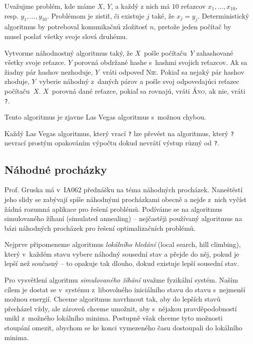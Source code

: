 \begin{example}
    Uvažujme problém, kde máme $X$, $Y$, a každý z nich má $10$ reťazcov
	$x_1, \ldots, x_10$, resp. $y_1, \ldots, y_10$. Problémom je zistiť,
	či existuje $j$ také, že $x_j = y_j$. Deterministický algoritmus 
	by potreboval komunikačnú zložitosť $n$, pretože jeden počítač
	by musel poslať všetky svoje slová druhému.
	
	Vytvorme náhodnostný algoritmus taký, že $X$~pošle počítaču~$Y$
	zahashované všetky svoje reťazce. $Y$ porovná obdržané hashe 
	s~hashmi svojich reťazcov. Ak sa žiadny pár hashov nezhoduje, 
	$Y$~vráti odpoveď \textsc{Nie}. Pokiaľ sa nejaký pár hashov
	zhoduje, $Y$~vyberie náhodný z~daných párov a pošle svoj odpovedajúci
	reťazec počítaču~$X$. $X$~porovná dané reťazce, pokiaľ sa rovnajú, 
	vráti \textsc{Áno}, ak nie, vráti \verb|?|.
	
	Tento algoritmus je zjavne Las Vegas algoritmus s~možnou chybou.
\end{example}

Každý Las Vegas algoritmus, který vrací \verb|?| lze převést na
algoritmus, který \verb|?| nevrací prostým opakováním výpočtu dokud
nevrátí výstup různý od \verb|?|.


\subsection{Náhodné procházky}

Prof. Gruska má v~IA062 přednášku na téma náhodných procházek.
Naneštěstí jeho slidy se zabývají spíše náhodnými procházkami obecně
a nejde z~nich vyčíst žádná rozumná aplikace pro řešení problémů.
Podíváme se na algoritmus simulovaného žíhaní (simulated annealing) --
nejčastěji používaný algoritmus na bázi náhodných procházek pro řešení
optimalizačních problémů.

Nejprve připomeneme algoritmus {\em lokálního hledání} (local search,
hill climbing), který v~každém stavu vybere náhodný sousední stav a
přejde do něj, pokud je lepší než současný -- to opakuje tak dlouho,
dokud existuje lepší sousední stav.



Pro vysvětlení algoritmu {\em simulovaného žíhání} uvažme fyzikální
systém. Naším cílem je dostat se v~systému z~libovolného iniciálního
stavu do stavu s~nejmenší možnou energií. Chceme algoritmus navrhnout
tak, aby do lepších stavů přecházel vždy, ale zároveň chceme umožnit,
aby s~nějakou pravděpodobností unikl z~možného lokálního minima.
Postupně však chceme tyto možnosti stoupání omezit, abychom
se ke konci vymezeného času dostoupali do lokálního minima.


